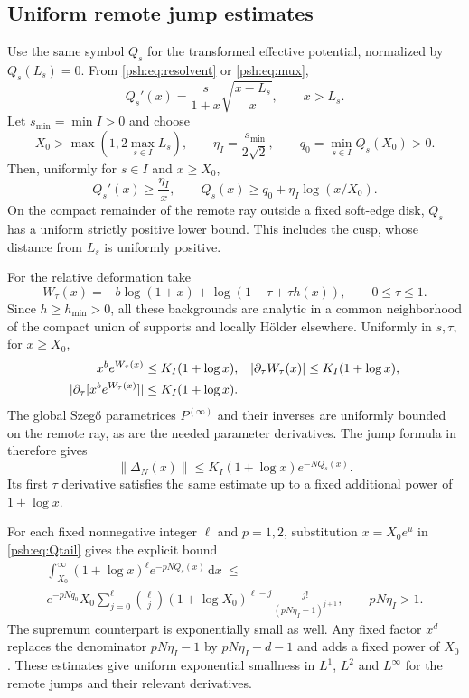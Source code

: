\documentclass[11pt,a4paper]{article}
\numberwithin{equation}{section}
\theoremstyle{remark}\newtheorem{remark}[theorem]{Remark}
\newcommand{\dd}{\,\mathrm d}
\newcommand{\norm}[1]{\lVert#1\rVert}
\begin{document}
\subsection{Uniform remote jump estimates}\label{psh:sec:tails}
Use the same symbol $Q_s$ for the transformed effective potential,
normalized by $Q_s(L_s)=0$. From \eqref{psh:eq:resolvent} or
\eqref{psh:eq:mux},
\begin{equation}\label{psh:eq:Qprime}
 Q_s'(x)=\frac{s}{1+x}\sqrt{\frac{x-L_s}{x}},\qquad x>L_s.
\end{equation}
Let $s_{\min}=\min I>0$ and choose
\[
 X_0>\max(1,2\max_{s\in I}L_s),\qquad
 \eta_I=\frac{s_{\min}}{2\sqrt2},\qquad
 q_0=\min_{s\in I}Q_s(X_0)>0.
\]
Then, uniformly for $s\in I$ and $x\geq X_0$,
\begin{equation}\label{psh:eq:Qtail}
 Q_s'(x)\geq\frac{\eta_I}{x},\qquad
 Q_s(x)\geq q_0+\eta_I\log(x/X_0).
\end{equation}
On the compact remainder of the remote ray outside a fixed soft-edge
disk, $Q_s$ has a uniform strictly positive lower bound. This includes
the cusp, whose distance from $L_s$ is uniformly positive.

For the relative deformation take
\begin{equation}\label{psh:eq:deformation}
 W_\tau(x)=-b\log(1+x)+\log(1-\tau+\tau h(x)),
 \qquad 0\leq\tau\leq1.
\end{equation}
Since $h\geq h_{\min}>0$, all these backgrounds are analytic in a common
neighborhood of the compact union of supports and locally H\"older
elsewhere. Uniformly in $s,\tau$, for $x\geq X_0$,
\begin{align}
 x^b e^{W_\tau(x)}&\leq K_I(1+\log x),
 &|\partial_\tau W_\tau(x)|&\leq K_I(1+\log x),\notag\\
 |\partial_\tau[x^b e^{W_\tau(x)}]|&\leq K_I(1+\log x).
 \label{psh:eq:Wbounds}
\end{align}
The global Szeg\H{o} parametrices $P^{(\infty)}$ and their inverses are
uniformly bounded on the remote ray, as are the needed parameter
derivatives. The jump formula in \cite[(5.15)]{psh-cg} therefore gives
\begin{equation}\label{psh:eq:deltabound}
 \norm{\Delta_N(x)}\leq K_I(1+\log x)e^{-NQ_s(x)}.
\end{equation}
Its first $\tau$ derivative satisfies the same estimate up to a fixed
additional power of $1+\log x$.

For each fixed nonnegative integer $\ell$ and $p=1,2$, substitution
$x=X_0e^u$ in \eqref{psh:eq:Qtail} gives the explicit bound
\begin{multline}\label{psh:eq:tailintegral}
 \int_{X_0}^\infty(1+\log x)^\ell e^{-pNQ_s(x)}\dd x\ \leq\\
 e^{-pNq_0}X_0
 \sum_{j=0}^\ell\binom\ell j(1+\log X_0)^{\ell-j}
       \frac{j!}{(pN\eta_I-1)^{j+1}},\qquad pN\eta_I>1.
\end{multline}
The supremum counterpart is exponentially small as well. Any fixed
factor $x^d$ replaces the denominator $pN\eta_I-1$ by
$pN\eta_I-d-1$ and adds a fixed power of $X_0$.
These estimates give uniform exponential smallness in $L^1$, $L^2$
and $L^\infty$ for the remote jumps and their relevant derivatives.
\end{document}
